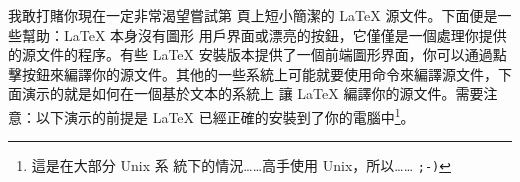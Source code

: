
我敢打賭你現在一定非常渴望嘗試第 \pageref{mini} 頁上短小簡潔的 \LaTeX{} 源文件。下面便是一些幫助：\LaTeX{} 本身沒有圖形
用戶界面或漂亮的按鈕，它僅僅是一個處理你提供的源文件的程序。有些 \LaTeX{} 安裝版本提供了一個前端圖形界面，你可以通過點
擊按鈕來編譯你的源文件。其他的一些系統上可能就要使用命令來編譯源文件，下面演示的就是如何在一個基於文本的系統上
讓 \LaTeX{} 編譯你的源文件。需要注意：以下演示的前提是 \LaTeX{} 已經正確的安裝到了你的電腦中\footnote{這是在大部分 Unix 系
統下的情況……高手使用 Unix，所以…… \texttt{;-)}}。

%
%
%
%
%
%
%

